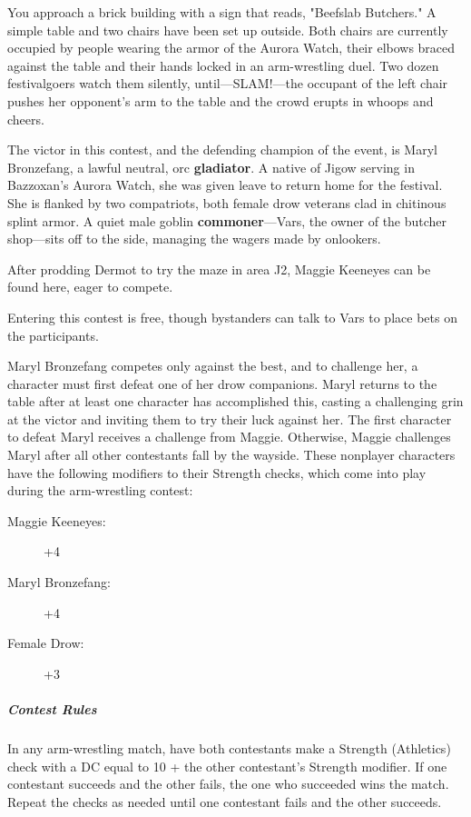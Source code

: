 \documentclass[10pt,a4paper,twoside,bg=print,twocolumn,openany,nodeprecatedcode]{dndbook}
\begin{document}
\begin{DndReadAloud}{}
You approach a brick building with a sign that reads, "Beefslab Butchers." A simple table and two chairs have been set up outside. Both chairs are currently occupied by people wearing the armor of the Aurora Watch, their elbows braced against the table and their hands locked in an arm-wrestling duel. Two dozen festivalgoers watch them silently, until—SLAM!—the occupant of the left chair pushes her opponent's arm to the table and the crowd erupts in whoops and cheers.

\end{DndReadAloud}

The victor in this contest, and the defending champion of the event, is Maryl Bronzefang, a lawful neutral, orc \textbf{gladiator}. A native of Jigow serving in Bazzoxan's Aurora Watch, she was given leave to return home for the festival. She is flanked by two compatriots, both female drow veterans clad in chitinous splint armor. A quiet male goblin \textbf{commoner}—Vars, the owner of the butcher shop—sits off to the side, managing the wagers made by onlookers.

After prodding Dermot to try the maze in area J2, Maggie Keeneyes can be found here, eager to compete.

Entering this contest is free, though bystanders can talk to Vars to place bets on the participants.

Maryl Bronzefang competes only against the best, and to challenge her, a character must first defeat one of her drow companions. Maryl returns to the table after at least one character has accomplished this, casting a challenging grin at the victor and inviting them to try their luck against her. The first character to defeat Maryl receives a challenge from Maggie. Otherwise, Maggie challenges Maryl after all other contestants fall by the wayside. These nonplayer characters have the following modifiers to their Strength checks, which come into play during the arm-wrestling contest:


\begin{description}
\item[Maggie Keeneyes:]
+4
\item[Maryl Bronzefang:]
+4
\item[Female Drow:]
+3
\end{description}

\subparagraph{Contest Rules}
In any arm-wrestling match, have both contestants make a Strength (Athletics) check with a DC equal to 10 + the other contestant's Strength modifier. If one contestant succeeds and the other fails, the one who succeeded wins the match. Repeat the checks as needed until one contestant fails and the other succeeds.
\end{document}
